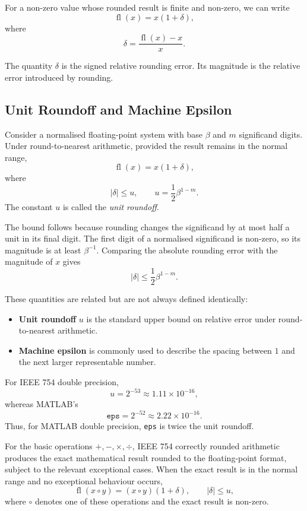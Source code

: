 For a non-zero value whose rounded result is finite and non-zero, we can write
\[
  \boxed{
    \operatorname{fl}(x)=x(1+\delta),
  }
\]
where
\[
  \boxed{
    \delta=\frac{\operatorname{fl}(x)-x}{x}.
  }
\]

The quantity \(\delta\) is the signed relative rounding error. Its magnitude is the relative error introduced by rounding.

\subsection{Unit Roundoff and Machine Epsilon}

\begin{definition}
  Consider a normalised floating-point system with base \(\beta\) and \(m\) significand digits. Under round-to-nearest arithmetic, provided the result remains in the normal range,
  \[
    \operatorname{fl}(x)=x(1+\delta),
  \]
  where
  \[
    \boxed{
      |\delta|\leq u,
      \qquad
      u=\frac12\beta^{1-m}.
    }
  \]
  The constant \(u\) is called the \emph{unit roundoff}.
\end{definition}

The bound follows because rounding changes the significand by at most half a unit in its final digit. The first digit of a normalised significand is non-zero, so its magnitude is at least \(\beta^{-1}\). Comparing the absolute rounding error with the magnitude of \(x\) gives
\[
  |\delta|\leq\frac12\beta^{1-m}.
\]

\begin{remark}
  These quantities are related but are not always defined identically:
  \begin{itemize}
    \item \textbf{Unit roundoff} \(u\) is the standard upper bound on relative error under round-to-nearest arithmetic.
    \item \textbf{Machine epsilon} is commonly used to describe the spacing between \(1\) and the next larger representable number.
  \end{itemize}
  For IEEE 754 double precision,
  \[
    \boxed{u=2^{-53}\approx1.11\times10^{-16},}
  \]
  whereas MATLAB's
  \[
    \boxed{\texttt{eps}=2^{-52}\approx2.22\times10^{-16}.}
  \]
  Thus, for MATLAB double precision, \texttt{eps} is twice the unit roundoff.
\end{remark}

\begin{remark}
  For the basic operations \(+,-,\times,\div\), IEEE 754 correctly rounded arithmetic produces the exact mathematical result rounded to the floating-point format, subject to the relevant exceptional cases. When the exact result is in the normal range and no exceptional behaviour occurs,
  \[
    \boxed{
      \operatorname{fl}(x\circ y)
      =(x\circ y)(1+\delta),
      \qquad |\delta|\leq u,
    }
  \]
  where \(\circ\) denotes one of these operations and the exact result is non-zero.
\end{remark}

